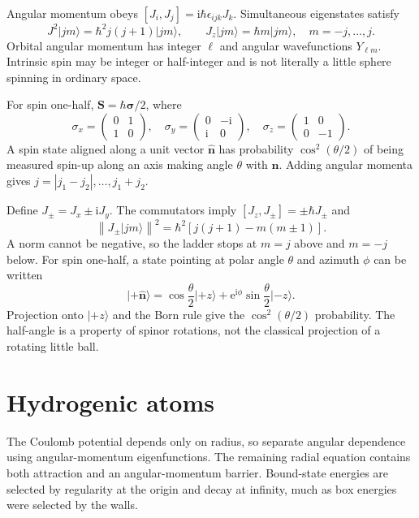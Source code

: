 \documentclass[11pt,oneside]{book}
\newcommand{\ii}{\mathrm{i}}
\newcommand{\ee}{\mathrm{e}}
\newcommand{\vect}[1]{\boldsymbol{#1}}
\newcommand{\ket}[1]{\lvert #1\rangle}
\newcommand{\norm}[1]{\left\lVert #1\right\rVert}
\theoremstyle{reviewstyle}
\begin{document}
Angular momentum obeys $[J_i,J_j]=\ii\hbar\epsilon_{ijk}J_k$. Simultaneous eigenstates satisfy
\begin{equation}J^2\ket{jm}=\hbar^2j(j+1)\ket{jm},\qquad J_z\ket{jm}=\hbar m\ket{jm},\quad m=-j,\ldots,j.\end{equation}
Orbital angular momentum has integer $\ell$ and angular wavefunctions $Y_{\ell m}$. Intrinsic spin may be integer or half-integer and is not literally a little sphere spinning in ordinary space.

For spin one-half, $\vect S=\hbar\vect\sigma/2$, where
\begin{equation}\sigma_x=\begin{pmatrix}0&1\\1&0\end{pmatrix},\quad \sigma_y=\begin{pmatrix}0&-\ii\\\ii&0\end{pmatrix},\quad \sigma_z=\begin{pmatrix}1&0\\0&-1\end{pmatrix}.\end{equation}
A spin state aligned along a unit vector $\hat{\vect n}$ has probability $\cos^2(\theta/2)$ of being measured spin-up along an axis making angle $\theta$ with $\hat{\vect n}$. Adding angular momenta gives $j=|j_1-j_2|,\ldots,j_1+j_2$.

Define $J_\pm=J_x\pm\ii J_y$. The commutators imply $[J_z,J_\pm]=\pm\hbar J_\pm$ and
\begin{equation}
\norm{J_\pm\ket{jm}}^2
=\hbar^2[j(j+1)-m(m\pm1)].
\end{equation}
A norm cannot be negative, so the ladder stops at $m=j$ above and $m=-j$ below. For spin one-half, a state pointing at polar angle $\theta$ and azimuth $\phi$ can be written
\begin{equation}
\ket{+\hat{\vect n}}=\cos\frac\theta2\ket{+z}
+\ee^{\ii\phi}\sin\frac\theta2\ket{-z}.
\end{equation}
Projection onto $\ket{+z}$ and the Born rule give the $\cos^2(\theta/2)$ probability. The half-angle is a property of spinor rotations, not the classical projection of a rotating little ball.

\section{Hydrogenic atoms}
The Coulomb potential depends only on radius, so separate angular dependence using angular-momentum eigenfunctions. The remaining radial equation contains both attraction and an angular-momentum barrier. Bound-state energies are selected by regularity at the origin and decay at infinity, much as box energies were selected by the walls.
\end{document}
